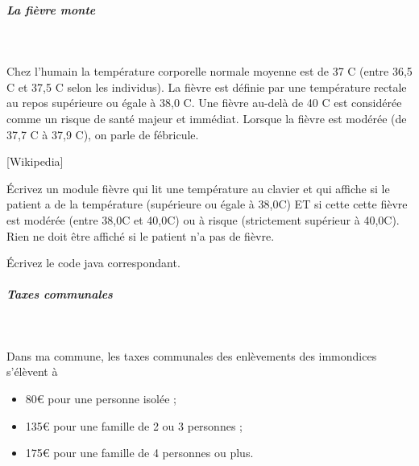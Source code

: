 \documentclass[11pt,a4paper]{article}
\begin{document}
            \par
        
			
		\subparagraph{La fi\`evre monte} 
		
					\textcolor{white}{.} \par
				
          Chez l'humain la temp\'erature corporelle normale moyenne est de 37 \textdegree C (entre 36,5 \textdegree C et 37,5 \textdegree C selon les individus). 
          La fi\`evre est d\'efinie par une temp\'erature rectale au repos sup\'erieure ou \'egale \`a 38,0 \textdegree C. 
          Une fi\`evre au-del\`a de 40 \textdegree C  est consid\'er\'ee comme un risque de sant\'e majeur et imm\'ediat. 
          Lorsque la fi\`evre est mod\'er\'ee (de 37,7 \textdegree C \`a 37,9 \textdegree C), on parle de f\'ebricule.\par
				
          [Wikipedia]
        
            \par
        
          \'Ecrivez un module fi\`evre qui lit une temp\'erature au clavier et qui affiche si le patient a de la
          temp\'erature (sup\'erieure ou \'egale \`a 38,0\textdegree C) ET si cette cette fi\`evre est mod\'er\'ee (entre 38,0\textdegree C 
          et 40,0\textdegree C) ou \`a risque (strictement sup\'erieur \`a 40,0\textdegree C). 
          Rien ne doit \^etre affich\'e si le patient n'a pas de fi\`evre.
        
            \par
        \'Ecrivez le code java correspondant.
            \par
        
			
		\subparagraph{Taxes communales} 
		
					\textcolor{white}{.} \par
				
          Dans ma commune, les taxes communales des enl\`evements des immondices s'\'el\`event \`a
          
					\begin{itemize}
				
			\item 80€ pour une personne isol\'ee ;
			\item 135€ pour une famille de 2 ou 3 personnes ;
			\item 175€ pour une famille de 4 personnes ou plus.
					\end{itemize}
				
\end{document}
